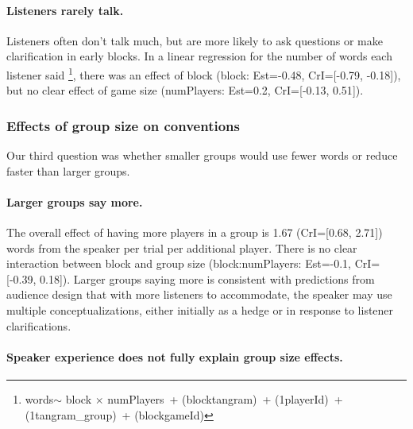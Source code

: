 \documentclass[
  english,
  a4paper,
]{article}
\begin{document}
\hypertarget{listeners-rarely-talk.}{%
\paragraph{Listeners rarely talk.}\label{listeners-rarely-talk.}}

Listeners often don't talk much, but are more likely to ask questions or make clarification in early blocks. In a linear regression for the number of words each listener said \footnote{words\(\sim\) block \(\times\) numPlayers~+ (block\textbar tangram)~+ (1\textbar playerId)~+ (1\textbar tangram\_group)~+ (block\textbar gameId)}, there was an effect of block (block: Est=-0.48, CrI={[}-0.79, -0.18{]}), but no clear effect of game size (numPlayers: Est=0.2, CrI={[}-0.13, 0.51{]}).

\hypertarget{effects-of-group-size-on-conventions}{%
\subsubsection{Effects of group size on conventions}\label{effects-of-group-size-on-conventions}}

Our third question was whether smaller groups would use fewer words or reduce faster than larger groups.

\hypertarget{larger-groups-say-more.}{%
\paragraph{Larger groups say more.}\label{larger-groups-say-more.}}

The overall effect of having more players in a group is 1.67 (CrI={[}0.68, 2.71{]}) words from the speaker per trial per additional player. There is no clear interaction between block and group size (block:numPlayers: Est=-0.1, CrI={[}-0.39, 0.18{]}). Larger groups saying more is consistent with predictions from audience design that with more listeners to accommodate, the speaker may use multiple conceptualizations, either initially as a hedge or in response to listener clarifications.

\hypertarget{speaker-experience-does-not-fully-explain-group-size-effects.}{%
\paragraph{Speaker experience does not fully explain group size effects.}\label{speaker-experience-does-not-fully-explain-group-size-effects.}}
\end{document}
